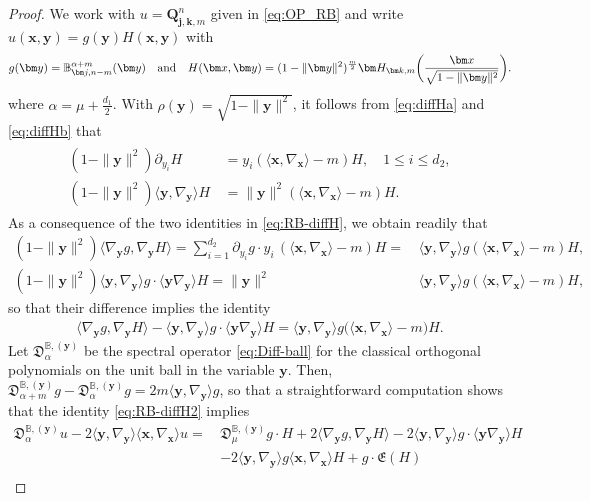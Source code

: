 \documentclass{amsart}
\theoremstyle{remark}
\def\la{{\langle}}
\def\ra{{\rangle}}
\def\fD{{\mathfrak D}}
\def\fE{{\mathfrak E}}
\def\a{{\alpha}}
\def\la{{\langle}}
\def\ra{{\rangle}}
\def\xb{{\bm x}}
\def\yb{{\bm y}}
\def\BB{{\mathbb B}}
\begin{document}
\begin{proof}
We work with $u =\bm Q_{\bm j, \bm k, m}^n$ given in \eqref{eq:OP_RB} and write 
$u(\bm x,\bm y) = g(\bm y) H(\bm x,\bm y)$ with 
$$
g(\bm y) = \BB_{\bm j, n-m}^{\a+m}(\bm y) \quad \hbox{and} \quad
  H(\bm x, \bm y) =  (1-\|\bm y\|^2)^{\frac{m}{2}}  
      \bm H_{\bm k, m} \bigg(\frac{\bm x}{\sqrt{1-\|\bm y\|^2}}\bigg).
$$
where $\a = \mu+ \frac{d_1}2$.
With $\rho(\yb) = \sqrt{1-\|\bm y\|^2}$, it follows from \eqref{eq:diffHa} and \eqref{eq:diffHb} that
\begin{align} \label{eq:RB-diffH}
 \begin{split}
    (1-\|\yb\|^2) \partial_{y_i} H \, & = y_i (\la \xb, \nabla_\xb \ra-m) H, \quad 1 \le i \le d_2, \\
    (1-\|\yb\|^2) \la \yb, \nabla_\yb\ra H \,& = \|\yb\|^2 (\la \xb, \nabla_\xb \ra -m) H.
\end{split}
\end{align}
As a consequence of the two identities in \eqref{eq:RB-diffH}, we obtain readily that 
\begin{align*}
   (1-\|\yb\|^2)  \la \nabla_\yb g, \nabla_\yb H \ra  = \sum_{i=1}^{d_2} \partial_{y_i} g \cdot y_i  \,  (\la \xb, \nabla_\xb \ra  -m) H
    =  \, & \la \yb, \nabla_\yb \ra g (\la \xb, \nabla_\xb \ra -m) H, \\
(1-\|\yb\|^2) \la \yb, \nabla_\yb\ra g \cdot \la \yb \nabla_\yb \ra H 
     =  \| \yb\|^2 \, & \la \yb, \nabla_\yb\ra g  (\la \xb, \nabla_\xb \ra -m) H,
\end{align*}
so that their difference implies the identity
\begin{align} \label{eq:RB-diffH2}
 \la \nabla_\yb g, \nabla_\yb H \ra -\la \yb, \nabla_\yb\ra g \cdot \la \yb \nabla_\yb \ra H 
      =  \la \yb, \nabla_\yb \ra g  \big (\la \xb, \nabla_\xb \ra -m \big) H.  
\end{align}
Let $\fD_\a^{\BB, (\yb)}$ be the spectral operator \eqref{eq:Diff-ball} for the classical orthogonal polynomials on 
the unit ball in the variable $\yb$. Then, $\fD_{\a+ m}^{\BB, (\yb)} g - \fD_\a^{\BB, (\yb)} g= 2m  \la \yb, \nabla_\yb \ra g$,
so that a straightforward computation shows that the identity \eqref{eq:RB-diffH2} implies 
\begin{align*}
\fD_\a^{\BB, (\yb)} u -2 \la \yb,\nabla_{\yb} \ra \la \xb,\nabla_{\xb} \ra u 
     = \,& \fD_\mu^{\BB, (\yb)} g \cdot H + 2  \la \nabla_\yb g, \nabla_\yb H \ra 
         - 2 \la \yb, \nabla_\yb\ra g \cdot \la \yb \nabla_\yb \ra H \\
    & -2 \la \yb,\nabla_{\yb} \ra g \la \xb,\nabla_{\xb} \ra H + g \cdot \fE(H) \\

\end{align*}
\end{proof}
\end{document}
